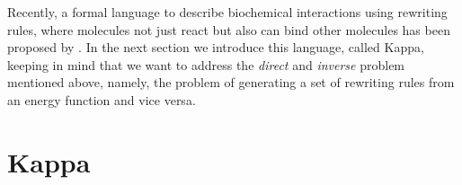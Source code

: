 Recently,
a formal language to describe biochemical interactions
using rewriting rules,
where molecules not just react but also can bind other molecules
has been proposed by \citet{danoslaneve2002a}.
In the next section we introduce this language, called Kappa,
keeping in mind that we want to address
the \emph{direct} and \emph{inverse} problem mentioned above,
namely, the problem of generating a set of rewriting rules
from an energy function and vice versa.


\section{Kappa}

















